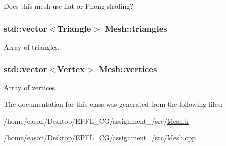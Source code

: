Does this mesh use flat or Phong shading? 

\subsubsection[{\texorpdfstring{triangles\+\_\+}{triangles_}}]{\setlength{\rightskip}{0pt plus 5cm}std\+::vector$<${\bf Triangle}$>$ Mesh\+::triangles\+\_\+\hspace{0.3cm}{\ttfamily [private]}}\hypertarget{classMesh_a13455b3ace274f1d3d36ee45c7a3988d}{}\label{classMesh_a13455b3ace274f1d3d36ee45c7a3988d}


Array of triangles. 

\subsubsection[{\texorpdfstring{vertices\+\_\+}{vertices_}}]{\setlength{\rightskip}{0pt plus 5cm}std\+::vector$<${\bf Vertex}$>$ Mesh\+::vertices\+\_\+\hspace{0.3cm}{\ttfamily [private]}}\hypertarget{classMesh_a986edf1ab1d37e517ff8adc928519528}{}\label{classMesh_a986edf1ab1d37e517ff8adc928519528}


Array of vertices. 



The documentation for this class was generated from the following files\+:\begin{DoxyCompactItemize}
\item 
/home/eason/\+Desktop/\+E\+P\+F\+L\+\_\+\+C\+G/assignment\+\_/src/\hyperlink{Mesh_8h}{Mesh.\+h}\item 
/home/eason/\+Desktop/\+E\+P\+F\+L\+\_\+\+C\+G/assignment\+\_/src/\hyperlink{Mesh_8cpp}{Mesh.\+cpp}\end{DoxyCompactItemize}
